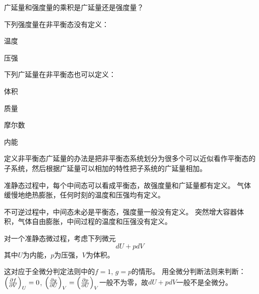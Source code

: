 \documentclass[CJK]{beamer}
\begin{document}
\begin{frame}
\bch
{}

广延量和强度量的乘积是广延量还是强度量？

\ech
\end{frame}

\begin{frame}
\bch

下列强度量在非平衡态没有定义：
\bitem
\item{温度}
\item{压强}
\eitem

\ech
\end{frame}


\begin{frame}
\bch

下列广延量在非平衡态也可以定义：
\bitem
\item{体积}
\item{质量}
\item{摩尔数}
\item{内能}
\eitem

定义非平衡态广延量的办法是把非平衡态系统划分为很多个可以近似看作平衡态的子系统，然后根据广延量可以相加的特性把子系统的广延量相加。


\ech
\end{frame}

\begin{frame}
\bch

\bitem
\item{准静态过程中，每个中间态可以看成平衡态，故强度量和广延量都有定义。
\bex
气体缓慢地绝热膨胀，任何时刻的温度和压强均有定义。
\eex
}
\item{不可逆过程中，中间态未必是平衡态，强度量一般没有定义。
\bex
突然增大容器体积，气体自由膨胀，中间过程的温度和压强没有定义。
\eex
}
\eitem

\ech
\end{frame}


\begin{frame}
\bch

对一个准静态微过程，考虑下列微元
$$ dU + pdV$$
其中$U$为内能，$p$为压强，$V$为体积。

这对应于全微分判定法则中的$f = 1$, $g = p$的情形。
用全微分判断法则来判断：
$\left(\frac{\partial f}{\partial V}\right)_{U} = 0$, $\left(\frac{\partial g}{\partial U}\right)_{V}=\left(\frac{\partial p}{\partial U}\right)_{V}$一般不为零，故$dU + pdV$一般不是全微分。

\ech
\end{frame}
\end{document}
